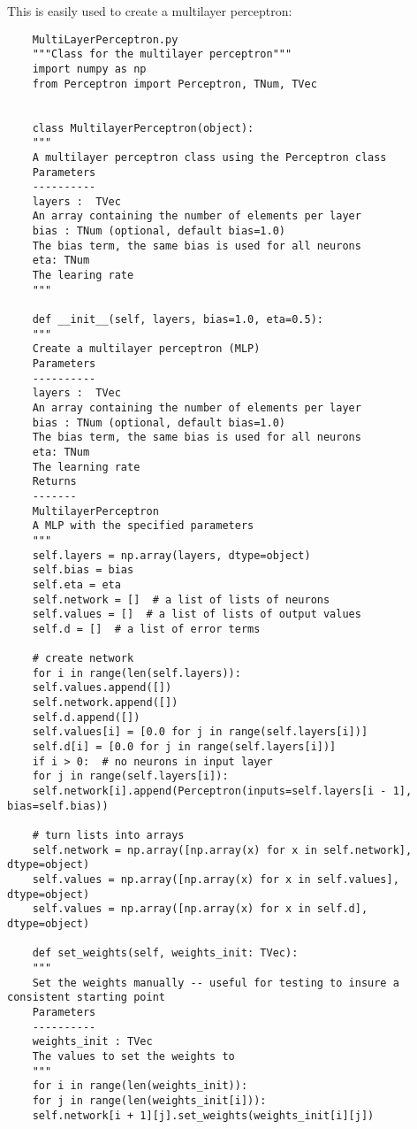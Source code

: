 \documentclass[a4paper]{article}
\begin{document}
    This is easily used to create a multilayer perceptron:
    \begin{lstlisting}
    MultiLayerPerceptron.py
    """Class for the multilayer perceptron"""
    import numpy as np
    from Perceptron import Perceptron, TNum, TVec
    
    
    class MultilayerPerceptron(object):
    """
    A multilayer perceptron class using the Perceptron class
    Parameters
    ----------
    layers :  TVec
    An array containing the number of elements per layer
    bias : TNum (optional, default bias=1.0)
    The bias term, the same bias is used for all neurons
    eta: TNum
    The learing rate
    """
    
    def __init__(self, layers, bias=1.0, eta=0.5):
    """
    Create a multilayer perceptron (MLP)
    Parameters
    ----------
    layers :  TVec
    An array containing the number of elements per layer
    bias : TNum (optional, default bias=1.0)
    The bias term, the same bias is used for all neurons
    eta: TNum
    The learning rate
    Returns
    -------
    MultilayerPerceptron
    A MLP with the specified parameters
    """
    self.layers = np.array(layers, dtype=object)
    self.bias = bias
    self.eta = eta
    self.network = []  # a list of lists of neurons
    self.values = []  # a list of lists of output values
    self.d = []  # a list of error terms
    
    # create network
    for i in range(len(self.layers)):
    self.values.append([])
    self.network.append([])
    self.d.append([])
    self.values[i] = [0.0 for j in range(self.layers[i])]
    self.d[i] = [0.0 for j in range(self.layers[i])]
    if i > 0:  # no neurons in input layer
    for j in range(self.layers[i]):
    self.network[i].append(Perceptron(inputs=self.layers[i - 1], bias=self.bias))
    
    # turn lists into arrays
    self.network = np.array([np.array(x) for x in self.network], dtype=object)
    self.values = np.array([np.array(x) for x in self.values], dtype=object)
    self.values = np.array([np.array(x) for x in self.d], dtype=object)
    
    def set_weights(self, weights_init: TVec):
    """
    Set the weights manually -- useful for testing to insure a consistent starting point
    Parameters
    ----------
    weights_init : TVec
    The values to set the weights to
    """
    for i in range(len(weights_init)):
    for j in range(len(weights_init[i])):
    self.network[i + 1][j].set_weights(weights_init[i][j])
    

\end{lstlisting}
\end{document}
